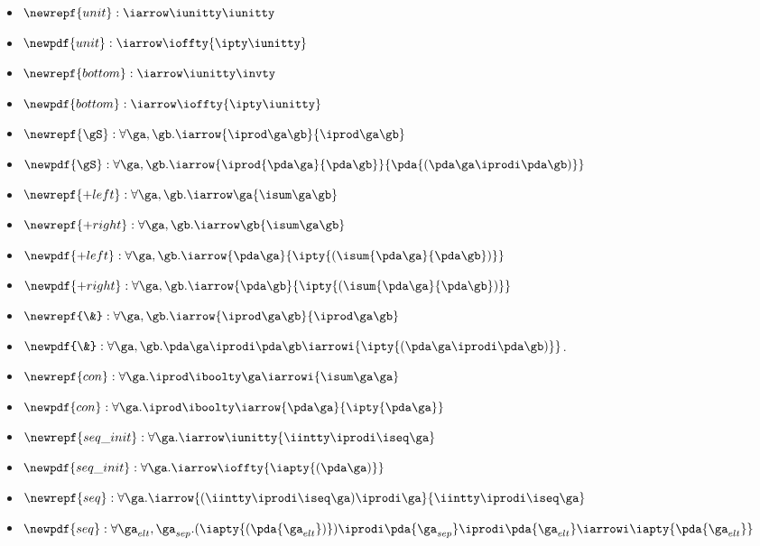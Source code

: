 \begin{lemma}
\label{lem:types-of-constructors}
\begin{itemize}
\item $\newrepf {unit} : \iarrow \iunitty \iunitty$
\item $\newpdf  {unit} : \iarrow \ioffty {\ipty \iunitty}$
\item $\newrepf {bottom} : \iarrow \iunitty \invty$
\item $\newpdf  {bottom} : \iarrow \ioffty {\ipty \iunitty}$
\item $\newrepf {\gS} : \forall \ga,\gb.\iarrow {\iprod \ga \gb} {\iprod \ga \gb}$
\item $\newpdf {\gS} : \forall \ga,\gb. 
  \iarrow {\iprod {\pda \ga} {\pda \gb}}
  {\pda {(\pda \ga \iprodi \pda \gb)}}
$
\item $\newrepf {+left} : \forall \ga, \gb.\iarrow \ga 
                            {\isum \ga \gb}$
\item $\newrepf {+right} : \forall \ga, \gb.\iarrow \gb {\isum \ga \gb}$
\item $\newpdf {+left} : \forall \ga, \gb.\iarrow {\pda \ga} 
  {\ipty {(\isum {\pda \ga}{\pda \gb})}}$
\item $\newpdf {+right} :\forall  \ga, \gb. \iarrow {\pda \gb} 
                            {\ipty {(\isum {\pda \ga} {\pda \gb})}}$
\item $\newrepf {\&} : \forall \ga,\gb.\iarrow {\iprod \ga \gb} {\iprod \ga \gb}$
\item $\newpdf {\&} : 
\forall \ga,\gb.
  \pda \ga \iprodi
  \pda \gb \iarrowi 
         {\ipty {(\pda \ga \iprodi \pda \gb)}}
$.
\item $\newrepf {con} : \forall \ga.\iprod \iboolty \ga 
  \iarrowi {\isum \ga \ga}$
\item $\newpdf {con} :\forall  \ga. \iprod \iboolty \iarrow {\pda \ga} {\ipty {\pda \ga}}$
\item $\newrepf {seq\_init} : \forall \ga.\iarrow \iunitty {\iintty \iprodi \iseq \ga}$
\item $\newpdf {seq\_init} : \forall \ga. \iarrow \ioffty {\iapty {(\pda\ga)}}$
\item $\newrepf {seq} : \forall \ga.\iarrow
  {(\iintty \iprodi \iseq \ga) \iprodi \ga}
  {\iintty \iprodi \iseq \ga}$
\item $\newpdf {seq} :\forall  {\ga_{elt}},{\ga_{sep}}. 
  (\iapty {(\pda {\ga_{elt}})}) \iprodi
  \pda {\ga_{sep}} \iprodi 
  \pda {\ga_{elt}} \iarrowi \\
  \iapty {\pda {\ga_{elt}}}$

\end{itemize}
\end{lemma}
